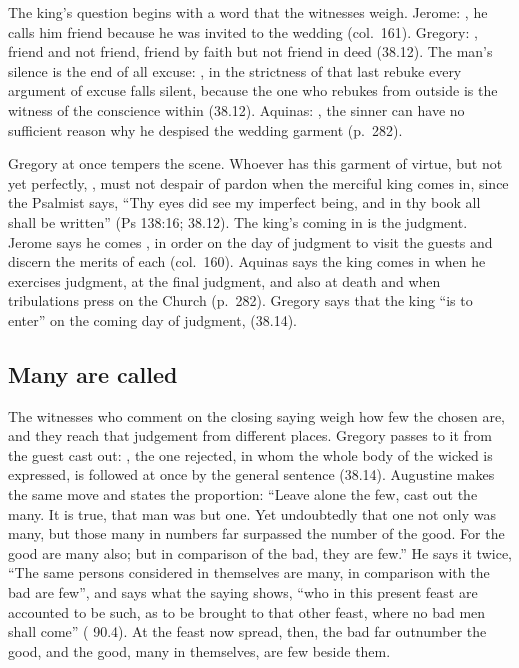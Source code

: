 The king's question begins with a word that the witnesses weigh. Jerome:
, he calls him friend because
he was invited to the wedding (col.~161). Gregory: , friend and not friend, friend
by faith but not friend in deed (38.12). The man's silence is the end of all
excuse: , in the strictness of that last rebuke every argument of
excuse falls silent, because the one who rebukes from outside is the witness
of the conscience within (38.12). Aquinas: , the sinner
can have no sufficient reason why he despised the wedding garment (p.~282).

Gregory at once tempers the scene. Whoever has this garment of virtue, but not
yet perfectly, , must
not despair of pardon when the merciful king comes in, since the Psalmist says,
``Thy eyes did see my imperfect being, and in thy book all shall be written''
(Ps 138:16; 38.12). The king's coming in is the judgment. Jerome says he comes
,
in order on the day of judgment to visit the guests and discern the merits of
each (col.~160). Aquinas says the king comes in when he
exercises judgment, at the final judgment, and also at death and when
tribulations press on the Church (p.~282). Gregory says that the king ``is to
enter'' on the coming day of judgment,  (38.14).

\subsection{Many are called}

The witnesses who comment on the closing saying weigh how few the chosen are,
and they reach that judgement from different places. Gregory passes to it from
the guest cast out: , the one rejected, in whom the whole body of the wicked is
expressed, is followed at once by the general sentence (38.14). Augustine makes
the same move and states the proportion: ``Leave alone the few, cast out the
many. It is true, that man was but one. Yet undoubtedly that one not only was
many, but those many in numbers far surpassed the number of the good. For the
good are many also; but in comparison of the bad, they are few.'' He says it
twice, ``The same persons considered in themselves are many, in comparison with
the bad are few'', and says what the saying shows, ``who in this present feast
are accounted to be such, as to be brought to that other feast, where no bad
men shall come'' ( 90.4). At the feast now spread, then, the bad
far outnumber the good, and the good, many in themselves, are few beside them.

